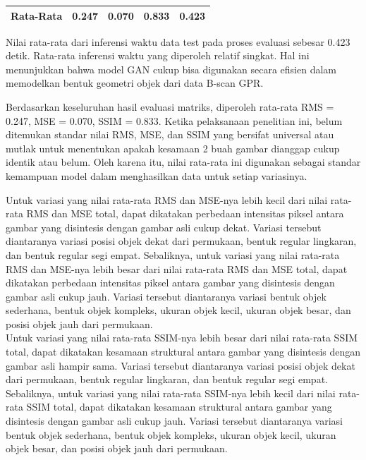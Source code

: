 \begin{table}[]
\begin{tabular}{|l|cc|cc|cc|c|}
  Rata-Rata                                           & \multicolumn{2}{c|}{\cellcolor[HTML]{FFFFFF}0.247}                                                    & \multicolumn{2}{c|}{0.070}                                                                              & \multicolumn{2}{c|}{0.833}                                                                           & 0.423                                                \\ \hline
  \end{tabular}
\end{table}

Nilai rata-rata dari inferensi waktu data test pada proses evaluasi sebesar 0.423 detik.
Rata-rata inferensi waktu yang diperoleh relatif singkat.
Hal ini menunjukkan bahwa model GAN cukup bisa digunakan secara efisien dalam memodelkan bentuk geometri objek dari data B-scan GPR.

Berdasarkan keseluruhan hasil evaluasi matriks, diperoleh rata-rata RMS = 0.247, MSE = 0.070, SSIM = 0.833.
Ketika pelaksanaan penelitian ini, belum ditemukan standar nilai RMS, MSE, dan SSIM yang bersifat universal atau mutlak untuk menentukan apakah kesamaan 2 buah gambar dianggap cukup identik atau belum. 
Oleh karena itu, nilai rata-rata ini digunakan sebagai standar kemampuan model dalam menghasilkan data untuk setiap variasinya.

Untuk variasi yang nilai rata-rata RMS dan MSE-nya lebih kecil dari nilai rata-rata RMS dan MSE total, dapat dikatakan perbedaan intensitas piksel antara gambar yang disintesis dengan gambar asli cukup dekat. 
Variasi tersebut diantaranya variasi posisi objek dekat dari permukaan, bentuk regular lingkaran, dan bentuk regular segi empat. 
Sebaliknya, untuk variasi yang nilai rata-rata RMS dan MSE-nya lebih besar dari nilai rata-rata RMS dan MSE total, dapat dikatakan perbedaan intensitas piksel antara gambar yang disintesis dengan gambar asli cukup jauh. 
Variasi tersebut diantaranya variasi bentuk objek sederhana, bentuk objek kompleks, ukuran objek kecil, ukuran objek besar, dan posisi objek jauh dari permukaan.\\

Untuk variasi yang nilai rata-rata SSIM-nya lebih besar dari nilai rata-rata SSIM total, dapat dikatakan kesamaan struktural antara gambar yang disintesis dengan gambar asli hampir sama. 
Variasi tersebut diantaranya variasi posisi objek dekat dari permukaan, bentuk regular lingkaran, dan bentuk regular segi empat. 
Sebaliknya, untuk variasi yang nilai rata-rata SSIM-nya lebih kecil dari nilai rata-rata SSIM total, dapat dikatakan kesamaan struktural antara gambar yang disintesis dengan gambar asli cukup jauh. 
Variasi tersebut diantaranya variasi bentuk objek sederhana, bentuk objek kompleks, ukuran objek kecil, ukuran objek besar, dan posisi objek jauh dari permukaan.

